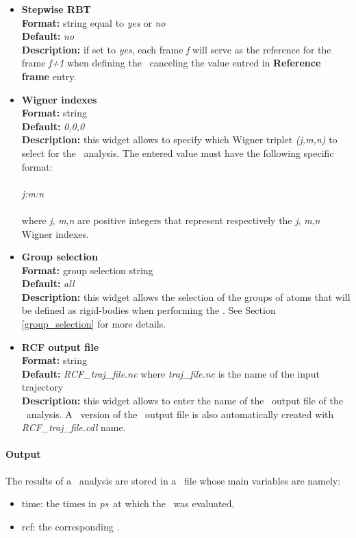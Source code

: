 \documentclass[a4paper,11pt]{report}
\newcommand{\ps}{\textit{ps}}
\begin{document}
\begin{itemize}
\item \textbf{Stepwise RBT}\\
\textbf{Format:} string equal to \textit{yes} or \textit{no}\\
\textbf{Default:} \textit{no}\\
\textbf{Description:} if set to \textit{yes}, each frame \textit{f} will serve as the reference for the frame \textit{f+1} 
when defining the \RBT\ canceling the value entred in \textbf{Reference frame} entry.

\item \textbf{Wigner indexes}\\
\textbf{Format:} string\\
\textbf{Default:} \textit{0,0,0}\\
\textbf{Description:} this widget allows to specify which Wigner triplet \textit{(j,m,n)} to select for the \RCF\ analysis. 
The entered value must have the following specific format:
\\\\
\textit{j:m:n}
\\\\
where \textit{j}, \textit{m},\textit{n} are positive integers that represent respectively the \textit{j}, \textit{m},\textit{n} Wigner indexes.

\item \textbf{Group selection}\\
\textbf{Format:} group selection string\\
\textbf{Default:} \textit{all}\\
\textbf{Description:} this widget allows the selection of the groups of atoms that will be defined as rigid-bodies when 
performing the \RCF . See Section \ref{group_selection} for more details.

\item \textbf{RCF output file}\\
\textbf{Format:} string\\
\textbf{Default:} \textit{RCF\_traj\_file.nc} where \textit{traj\_file.nc} is the name of the input trajectory\\
\textbf{Description:} this widget allows to enter the name of the \NetCDF\ output file of the \RCF\ analysis. A \CDL\ 
version of the \NetCDF\ output file is also automatically created with \textit{RCF\_traj\_file.cdl} name.
\end{itemize}

\paragraph{Output\\}
The results of a \RCF\ analysis are stored in a \NetCDF\ file whose main variables are namely:
\begin{itemize}
\item time: the times in \ps\ at which the \RCF\ was evaluated,
\item rcf: the corresponding \RCF .
\end{itemize}
\end{document}
